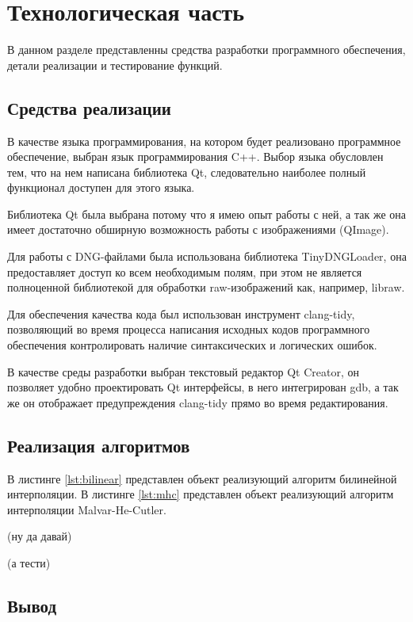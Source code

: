 \chapter{Технологическая часть}

В данном разделе представленны средства разработки программного обеспечения, детали реализации и тестирование функций.

\section{Средства реализации}

В качестве языка программирования, на котором будет реализовано программное обеспечение, выбран язык программирования C++. Выбор языка обусловлен тем, что на нем написана библиотека Qt, следовательно наиболее полный функционал доступен для этого языка. 

Библиотека Qt была выбрана потому что я имею опыт работы с ней, а так же она имеет достаточно обширную возможность работы с изображениями (QImage).

Для работы с DNG-файлами была использована библиотека TinyDNGLoader, она предоставляет доступ ко всем необходимым полям, при этом не является полноценной библиотекой для обработки raw-изображений как, например, libraw.

Для обеспечения качества кода был использован инструмент clang-tidy, позволяющий во время процесса написания исходных кодов программного обеспечения контролировать наличие синтаксических и логических ошибок.

В качестве среды разработки выбран текстовый редактор Qt Creator, он позволяет удобно проектировать Qt интерфейсы, в него интегрирован gdb, а так же он отображает предупреждения clang-tidy прямо во время редактирования.

\section{Реализация алгоритмов}

В листинге \ref{lst:bilinear} представлен объект реализующий алгоритм билинейной интерполяции. В листинге \ref{lst:mhc} представлен объект реализующий алгоритм интерполяции Malvar-He-Cutler.

(ну да давай)

(а тести)

\section*{Вывод}

